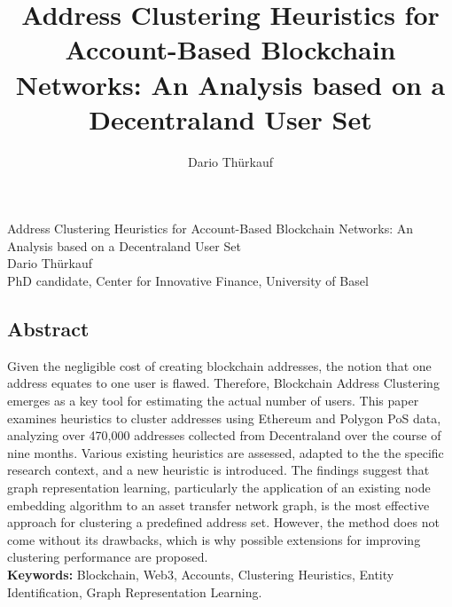 \documentclass[12pt,a4paper,titlepage,oneside,english]{article}
\title{Address Clustering Heuristics for Account-Based Blockchain Networks: An Analysis based on a Decentraland User Set}
\author{Dario Thürkauf}
\begin{document}
\begin{titlepage}
\begin{center}
\vspace{1em}
\Large Address Clustering Heuristics for Account-Based Blockchain Networks: An Analysis based on a Decentraland User Set \\
\large \vspace{2em}
Dario Thürkauf \\
\vspace{1em}
\normalsize
PhD candidate, Center for Innovative Finance, University of Basel\\
\vspace{2em}
\end{center}

\normalsize

\onehalfspacing
\begin{center}
\section*{Abstract}
\end{center}
Given the negligible cost of creating blockchain addresses, the notion that one address equates to one user is flawed. Therefore, Blockchain Address Clustering emerges as a key tool for estimating the actual number of users. This paper examines heuristics to cluster addresses using Ethereum and Polygon PoS data, analyzing over 470,000 addresses collected from Decentraland over the course of nine months. Various existing heuristics are assessed, adapted to the the specific research context, and a new heuristic is introduced. The findings suggest that graph representation learning, particularly the application of an existing node embedding algorithm to an asset transfer network graph, is the most effective approach for clustering a predefined address set. However, the method does not come without its drawbacks, which is why possible extensions for improving clustering performance are proposed. \\ %

\vfill
\textbf{Keywords:} Blockchain, Web3, Accounts, Clustering Heuristics, Entity Identification, Graph Representation Learning.\\
\end{titlepage}
\end{document}

